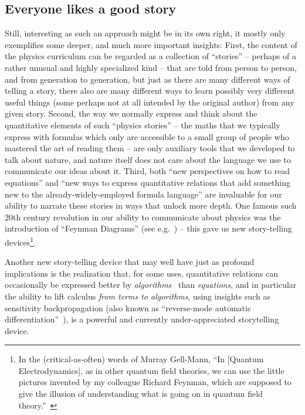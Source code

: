 \documentclass[twocolumn]{article}
\begin{document}
\subsection{Everyone likes a good story}

Still, interesting as such an approach might be in its own right, it
mostly only exemplifies some deeper, and much more important insights:
First, the content of the physics curriculum can be regarded as a
collection of ``stories'' -- perhaps of a rather unusual and highly
specialized kind -- that are told from person to person, and from
generation to generation, but just as there are many different ways of
telling a story, there also are many different ways to learn possibly
very different useful things (some perhaps not at all intended by the
original author) from any given story. Second, the way we normally
express and think about the quantitative elements of such ``physics
stories'' -- the maths that we typically express with formulas which
only are accessible to a small group of people who mastered the art of
reading them -- are only auxiliary tools that we developed to talk
about nature, and nature itself does not care about the language we
use to communicate our ideas about it. Third, both ``new perspectives
on how to read equations'' and ``new ways to express quantitative
relations that add something new to the already-widely-employed
formula language'' are invaluable for our ability to narrate these
stories in ways that unlock more depth. One famous such 20th century
revolution in our ability to communicate about physics was the
introduction of ``Feynman Diagrams'' (see e.g.~\cite{schweber2020qed})
-- this gave us new story-telling devices\footnote{In the
(critical-as-often) words of Murray Gell-Mann, ``In [Quantum
  Electrodynamics], as in other quantum field theories, we can use the
little pictures invented by my colleague Richard Feynman, which are
supposed to give the illusion of understanding what is going on in
quantum field theory.''~\cite{mulvey1980nature}}.

Another new story-telling device that may well have just as
profound implications is the realization that, for some uses,
quantitative relations can occasionally be expressed better by
\emph{algorithms}~\cite{sussman2015structure} than \emph{equations},
and in particular the ability to lift calculus \emph{from terms to
algorithms}, using insights such as sensitivity backpropagation (also
known as ``reverse-mode automatic
differentiation''~\cite{speelpenning1980compiling}), is a powerful and
currently under-appreciated storytelling device.
\end{document}
